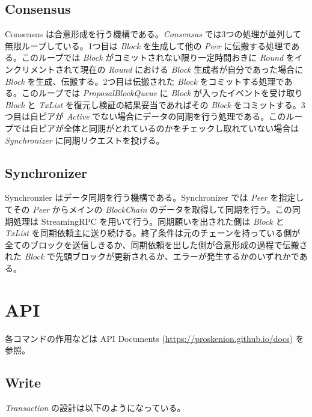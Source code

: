 \hypertarget{consensus}{%
\subsection{Consensus}\label{consensus}}

Consensus は合意形成を行う機構である。\emph{Consensus}
では3つの処理が並列して無限ループしている。1つ目は \emph{Block}
を生成して他の \emph{Peer} に伝搬する処理である。このループでは
\emph{Block} がコミットされない限り一定時間おきに \emph{Round}
をインクリメントされて現在の \emph{Round} における \emph{Block}
生成者が自分であった場合に \emph{Block}
を生成、伝搬する。2つ目は伝搬された \emph{Block}
をコミットする処理である。このループでは \emph{ProposalBlockQueue} に
\emph{Block} が入ったイベントを受け取り \emph{Block} と \emph{TxList}
を復元し検証の結果妥当であればその \emph{Block}
をコミットする。3つ目は自ピアが \emph{Active}
でない場合にデータの同期を行う処理である。このループでは自ピアが全体と同期がとれているのかをチェックし取れていない場合は
\emph{Synchronizer} に同期リクエストを投げる。

\hypertarget{synchronizer}{%
\subsection{Synchronizer}\label{synchronizer}}

Synchronzier はデータ同期を行う機構である。Synchronizer では \emph{Peer}
を指定してその \emph{Peer} からメインの \emph{BlockChain}
のデータを取得して同期を行う。この同期処理は StreamingRPC
を用いて行う。同期願いを出された側は \emph{Block} と \emph{TxList}
を同期依頼主に送り続ける。終了条件は元のチェーンを持っている側が全てのブロックを送信しきるか、同期依頼を出した側が合意形成の過程で伝搬された
\emph{Block}
で先頭ブロックが更新されるか、エラーが発生するかのいずれかである。

\hypertarget{api}{%
\section{API}\label{api}}

各コマンドの作用などは API Documents
(\url{https://proskenion.github.io/docs}) を参照。

\hypertarget{write}{%
\subsection{Write}\label{write}}

\emph{Transaction} の設計は以下のようになっている。

